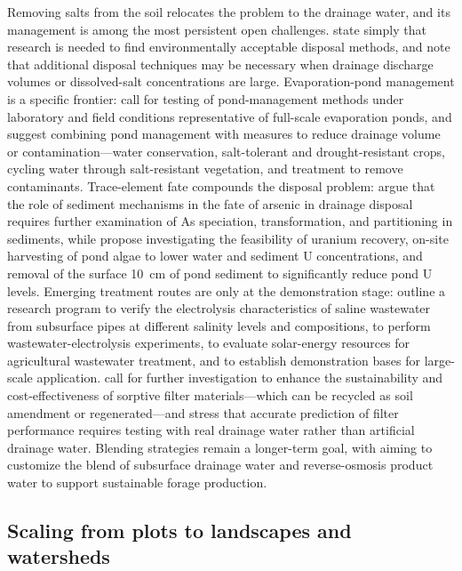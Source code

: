 Removing salts from the soil relocates the problem to the drainage water, and its management is among the most persistent open challenges. \textcite{Ayars2014} state simply that research is needed to find environmentally acceptable disposal methods, and \textcite{Steppuhn2006} note that additional disposal techniques may be necessary when drainage discharge volumes or dissolved-salt concentrations are large. Evaporation-pond management is a specific frontier: \textcite{BRADFORD1991} call for testing of pond-management methods under laboratory and field conditions representative of full-scale evaporation ponds, and suggest combining pond management with measures to reduce drainage volume or contamination---water conservation, salt-tolerant and drought-resistant crops, cycling water through salt-resistant vegetation, and treatment to remove contaminants. Trace-element fate compounds the disposal problem: \textcite{Gao2007} argue that the role of sediment mechanisms in the fate of arsenic in drainage disposal requires further examination of As speciation, transformation, and partitioning in sediments, while \textcite{Duff1997} propose investigating the feasibility of uranium recovery, on-site harvesting of pond algae to lower water and sediment U concentrations, and removal of the surface 10~cm of pond sediment to significantly reduce pond U levels. Emerging treatment routes are only at the demonstration stage: \textcite{Yang2023} outline a research program to verify the electrolysis characteristics of saline wastewater from subsurface pipes at different salinity levels and compositions, to perform wastewater-electrolysis experiments, to evaluate solar-energy resources for agricultural wastewater treatment, and to establish demonstration bases for large-scale application. \textcite{Pugliese2023} call for further investigation to enhance the sustainability and cost-effectiveness of sorptive filter materials---which can be recycled as soil amendment or regenerated---and stress that accurate prediction of filter performance requires testing with real drainage water rather than artificial drainage water. Blending strategies remain a longer-term goal, with \textcite{Singh2020d} aiming to customize the blend of subsurface drainage water and reverse-osmosis product water to support sustainable forage production.

\subsection{Scaling from plots to landscapes and watersheds}

